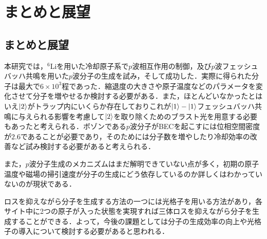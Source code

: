 \documentclass[11pt,a4j,notitlepage]{jreport}
\begin{document}
\chapter{まとめと展望}
\section{まとめと展望}
本研究では，$^6$Liを用いた冷却原子系で$p$波相互作用の制御，及び$p$波フェッシュバッハ共鳴を用いた$p$波分子の生成を試み，そして成功した．実際に得られた分子は最大で$6\times10^3$程であった．縮退度の大きさや原子温度などのパラメータを変化させて分子を増やせるか検討する必要がある．また，ほとんどいなかったとはいえ$\ket{2}$がトラップ内にいくらか存在しておりこれが$\ket{1}-\ket{1}$フェッシュバッハ共鳴に与えられる影響を考慮して$\ket{2}$を取り除くためのブラスト光を用意する必要もあったと考えられる．ボゾンである$p$波分子がBECを起こすには位相空間密度が$2.6$であることが必要であり，そのためには分子数を増やしたり冷却効率の改善など試み検討する必要があると考えられる\cite{InaD}．

また，$p$波分子生成のメカニズムはまだ解明できていない点が多く，初期の原子温度や磁場の掃引速度が分子の生成にどう依存しているのか詳しくはわかっていないのが現状である\cite{InaD}．

ロスを抑えながら分子を生成する方法の一つには光格子を用いる方法があり，各サイト中に2つの原子が入った状態を実現すれば三体ロスを抑えながら分子を生成することができる．よって，今後の課題としては分子の生成効率の向上や光格子の導入について検討する必要があると思われる．

\appendix
\end{document}
